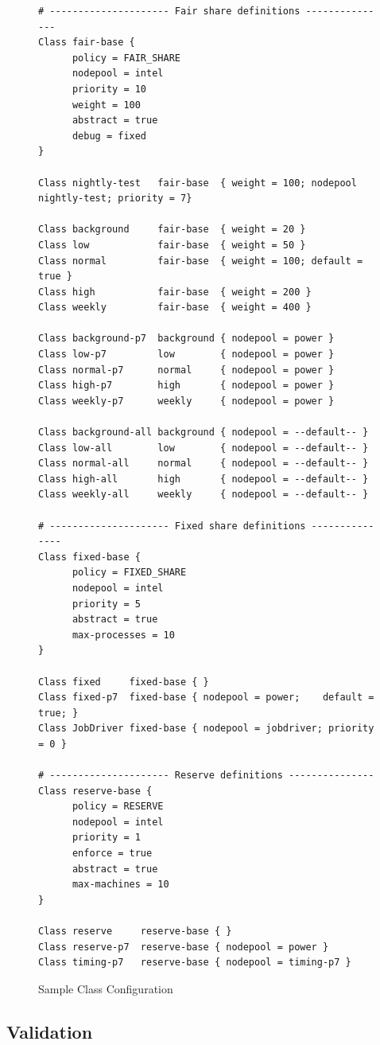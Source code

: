    \begin{figure}[H]    
\begin{verbatim}
# --------------------- Fair share definitions ---------------
Class fair-base {
      policy = FAIR_SHARE
      nodepool = intel
      priority = 10
      weight = 100
      abstract = true
      debug = fixed
}

Class nightly-test   fair-base  { weight = 100; nodepool nightly-test; priority = 7}

Class background     fair-base  { weight = 20 }
Class low            fair-base  { weight = 50 }
Class normal         fair-base  { weight = 100; default = true }
Class high           fair-base  { weight = 200 }
Class weekly         fair-base  { weight = 400 }

Class background-p7  background { nodepool = power }
Class low-p7         low        { nodepool = power }
Class normal-p7      normal     { nodepool = power }
Class high-p7        high       { nodepool = power }
Class weekly-p7      weekly     { nodepool = power }

Class background-all background { nodepool = --default-- }
Class low-all        low        { nodepool = --default-- }
Class normal-all     normal     { nodepool = --default-- }
Class high-all       high       { nodepool = --default-- }
Class weekly-all     weekly     { nodepool = --default-- }

# --------------------- Fixed share definitions ---------------
Class fixed-base {
      policy = FIXED_SHARE
      nodepool = intel
      priority = 5
      abstract = true
      max-processes = 10
}

Class fixed     fixed-base { }
Class fixed-p7  fixed-base { nodepool = power;    default = true; }
Class JobDriver fixed-base { nodepool = jobdriver; priority = 0 }      

# --------------------- Reserve definitions ---------------
Class reserve-base {
      policy = RESERVE
      nodepool = intel
      priority = 1
      enforce = true
      abstract = true
      max-machines = 10
}
 
Class reserve     reserve-base { }
Class reserve-p7  reserve-base { nodepool = power }
Class timing-p7   reserve-base { nodepool = timing-p7 }
\end{verbatim}
          \caption{Sample Class Configuration}
      \label{fig:class.configuration}
    \end{figure}
    
\subsection{Validation}


